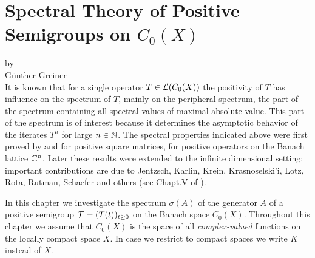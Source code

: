 \setcounter{chapter}{2}
\chapter{Spectral Theory of Positive Semigroups on \texorpdfstring{$C_{0}(X)$}{C(X)}}\label{chap:b3}%
{\Large
\vspace*{-.75cm}
by \\[.25em]
Günther Greiner
\vspace{.75cm}
\\
}
It is known that for a single operator $T \in \mathcal{L}(C_{0}(X))$ the positivity of $T$ has influence on the spectrum of $T$, mainly on the peripheral spectrum, \ie the part of the spectrum containing all spectral values of maximal absolute value.
This part of the spectrum is of interest because it determines the asymptotic behavior of the iterates $T^{n}$ for large $n \in \mathbb{N}$.
The spectral properties indicated above were first proved by \citet{perron:1907} and \citet{frobenius:1909} for positive square matrices, \ie for positive operators on the Banach lattice $\mathbb{C}^{n}$.
Later these results were extended to the infinite dimensional setting; important contributions are due to Jentzsch, Karlin, Krein, Krasnoselski'i, Lotz, Rota, Rutman, Schaefer and others (see Chapt.V of \citet{schaefer:1974}).

In this chapter we investigate the spectrum $\sigma(A)$ of the generator $A$ of a positive semigroup $\mathcal{T} = (T(t))_{t \geq 0}$ on the Banach space $C_{0}(X)$.
Throughout this chapter we assume that $C_{0}(X)$ is the space of all \emph{complex-valued} functions on the locally compact space $X$.
In case we restrict to compact spaces we write $K$ instead of $X$.
